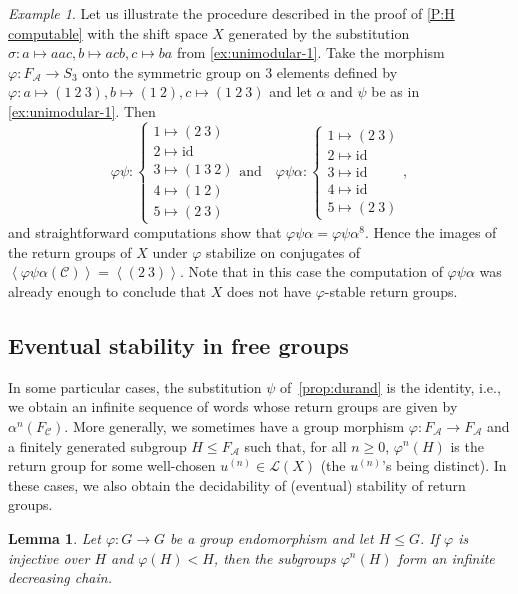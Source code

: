 \documentclass{amsart}
\newcommand*{\lang}{\mathcal{L}}
\newcommand*{\cA}{\mathcal{A}}
\newcommand*{\cC}{\mathcal{C}}
\newcommand*{\from}{\colon}
\newcommand*{\id}{\mathrm{id}}
\newcommand{\displaysub}[1]{\begin{cases}#1\end{cases}}
\newcommand*{\gen}[1]{\left\langle #1\right\rangle}
\theoremstyle{plain}
\newtheorem{lemma}[theorem]{Lemma}
\theoremstyle{definition}
\theoremstyle{remark}
\newtheorem{example}[theorem]{Example}
\begin{document}
\begin{example}\label{ex:unimodular-2}
    Let us illustrate the procedure described in the proof of \cref{P:H computable} with the shift space $X$ generated by the substitution $\sigma\from a\mapsto aac, b\mapsto acb, c\mapsto ba$ from \cref{ex:unimodular-1}. Take the morphism $\varphi\from F_\cA\to S_3$ onto the symmetric group on 3 elements defined by $\varphi\from a\mapsto (1\:2\:3), b\mapsto(1\:2), c\mapsto(1\:2\:3)$ and let $\alpha$ and $\psi$ be as in \cref{ex:unimodular-1}. Then
    \begin{equation*}
        \varphi\psi \from \displaysub{ 1\mapsto (2\:3) \\ 2\mapsto \id \\ 3\mapsto (1\:3\:2) \\ 4\mapsto (1\:2) \\ 5 \mapsto (2\:3) }
        \text{and}\quad
        \varphi\psi\alpha \from \displaysub{ 1\mapsto (2\:3) \\ 2\mapsto \id \\ 3\mapsto \id \\ 4\mapsto \id \\ 5 \mapsto (2\:3) },
    \end{equation*}
    and straightforward computations show that $\varphi\psi\alpha=\varphi\psi\alpha^8$. Hence the images of the return groups of $X$ under $\varphi$ stabilize on conjugates of $\gen{\varphi\psi\alpha(\cC)} = \gen{(2\:3)}$. Note that in this case the computation of $\varphi\psi\alpha$ was already enough to conclude that $X$ does not have $\varphi$-stable return groups.
\end{example}

\subsection{Eventual stability in free groups}

In some particular cases, the substitution $\psi$ of~\cref{prop:durand} is the identity, i.e., we obtain an infinite sequence of words whose return groups are given by $\alpha^n(F_\cC)$. 
More generally, we sometimes have a group morphism $\varphi\from F_\cA \to F_\cA$ and a finitely generated subgroup $H \leq F_\cA$ such that, for all $n \ge 0$, $\varphi^n(H)$ is the return group for some well-chosen $u^{(n)} \in \lang(X)$ (the $u^{(n)}$'s being distinct).
In these cases, we also obtain the decidability of (eventual) stability of return groups.

\begin{lemma}\label{l:decreasing-chain}
    Let $\varphi\from G \to G$ be a group endomorphism and let $H \leq G$. If $\varphi$ is injective over $H$ and $\varphi(H) < H$, then the subgroups $\varphi^n(H)$ form an infinite decreasing chain.
\end{lemma}
\end{document}
